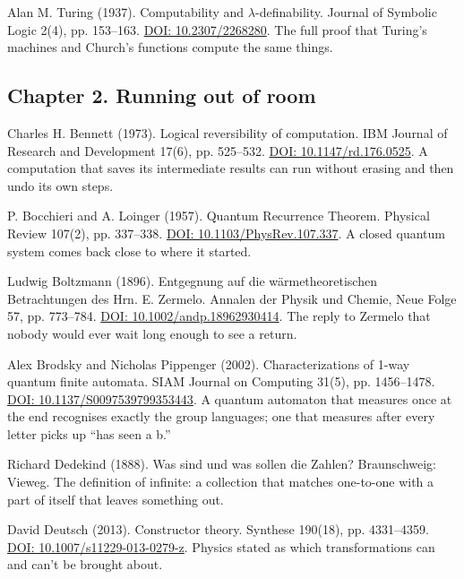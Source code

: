 \noindent Alan M. Turing (1937). Computability and $\lambda$-definability. Journal of Symbolic Logic 2(4), pp. 153--163. \href{https://doi.org/10.2307/2268280}{DOI: 10.2307/2268280}. The full proof that Turing's machines and Church's functions compute the same things.
\par\medskip

\subsection*{Chapter 2. Running out of room}

\noindent Charles H. Bennett (1973). Logical reversibility of computation. IBM Journal of Research and Development 17(6), pp. 525--532. \href{https://doi.org/10.1147/rd.176.0525}{DOI: 10.1147/rd.176.0525}. A computation that saves its intermediate results can run without erasing and then undo its own steps.
\par\medskip

\noindent P. Bocchieri and A. Loinger (1957). Quantum Recurrence Theorem. Physical Review 107(2), pp. 337--338. \href{https://doi.org/10.1103/PhysRev.107.337}{DOI: 10.1103/PhysRev.107.337}. A closed quantum system comes back close to where it started.
\par\medskip

\noindent Ludwig Boltzmann (1896). Entgegnung auf die w\"armetheoretischen Betrachtungen des Hrn. E. Zermelo. Annalen der Physik und Chemie, Neue Folge 57, pp. 773--784. \href{https://doi.org/10.1002/andp.18962930414}{DOI: 10.1002/andp.18962930414}. The reply to Zermelo that nobody would ever wait long enough to see a return.
\par\medskip

\noindent Alex Brodsky and Nicholas Pippenger (2002). Characterizations of 1-way quantum finite automata. SIAM Journal on Computing 31(5), pp. 1456--1478. \href{https://doi.org/10.1137/S0097539799353443}{DOI: 10.1137/S0097539799353443}. A quantum automaton that measures once at the end recognises exactly the group languages; one that measures after every letter picks up ``has seen a b.''
\par\medskip

\noindent Richard Dedekind (1888). Was sind und was sollen die Zahlen? Braunschweig: Vieweg. The definition of infinite: a collection that matches one-to-one with a part of itself that leaves something out.
\par\medskip

\noindent David Deutsch (2013). Constructor theory. Synthese 190(18), pp. 4331--4359. \href{https://doi.org/10.1007/s11229-013-0279-z}{DOI: 10.1007/s11229-013-0279-z}. Physics stated as which transformations can and can't be brought about.
\par\medskip


